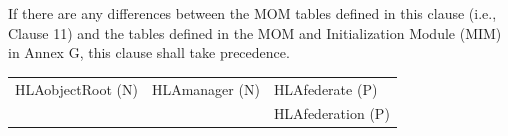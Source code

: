 \begin{compactstdpage}
    If there are any differences between the MOM tables defined in this clause (i.e., Clause 11) and the tables defined in the MOM and Initialization Module (MIM) in Annex G, this clause shall take precedence.

    \begin{momtabletypeset}[7.0]
        \begin{center}
            \begin{tabular}{Y{1.75in}Y{1.75in}Y{1.45in}}
                HLAobjectRoot (N) & HLAmanager (N) & HLAfederate (P)   \\
                &                & HLAfederation (P)
            \end{tabular}
        \end{center}
    \end{momtabletypeset}
\end{compactstdpage}

